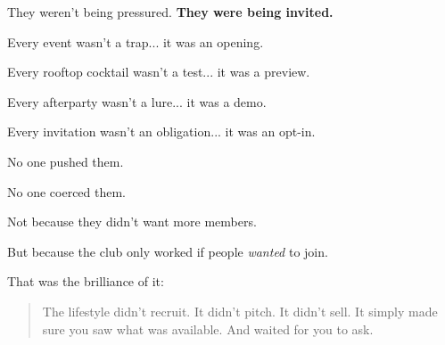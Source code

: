 \medskip



They weren’t being pressured.  \textbf{They were being invited.}

Every event wasn’t a trap... it was an opening.

Every rooftop cocktail wasn’t a test... it was a preview.  

Every afterparty wasn’t a lure... it was a demo.  

Every invitation wasn’t an obligation... it was an opt-in.

No one pushed them.

No one coerced them.

Not because they didn't want more members.

But because the club only worked if people \textit{wanted} to join.

That was the brilliance of it:

\begin{quote}
The lifestyle didn’t recruit.  
It didn’t pitch.  
It didn’t sell.  
It simply made sure you saw what was available.  
And waited for you to ask.
\end{quote}

